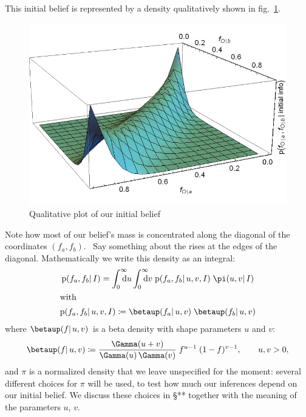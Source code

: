 \documentclass[\ifafour a4paper,12pt,\else a5paper,10pt,\fi%
onecolumn,oneside,article,%
british%
]{memoir}
\theoremstyle{remark}
\theoremstyle{innote}
\newcommand*{\di}{\mathrm{d}}%
\newcommand*{\defd}{\coloneqq}
\newcommand*{\pf}{\mathrm{p}}%
\renewcommand*{\|}{\mathpunct{|}}
\newcommand*{\sect}{\S}%
\newcommand*{\fig}{fig.}%
\newcommand*{\puzzle}{\maltese}
\newcommand{\mynote}[1]{ {\color{notecolour}\puzzle\ #1}}
\newcommand*{\yI}{I}
\newcommand*{\ya}{a}
\newcommand*{\yb}{b}
\newcommand*{\dbeta}{\betaup}
\newcommand*{\dA}{\pi}
\newcommand*{\yua}{u}
\newcommand*{\yub}{v}
\begin{document}
This initial belief is represented by a density qualitatively shown in
\fig~\ref{fig:initial_belief}.
\begin{figure}[b!]%
 \centering\includegraphics[width=0.95\linewidth]{prior3d.png}
\caption{Qualitative plot of our initial belief}\label{fig:initial_belief}
\end{figure}%
Note how most of our belief's mass is concentrated along the diagonal of
the coordinates $(f_{\ya}, f_{\yb})$. \mynote{Say something
  about the rises at the edges of the diagonal.} Mathematically we write
this density as an integral:
\begin{gather}
  \label{eq:beta_gamma_prior}
  \pf(f_{\ya}, f_{\yb} \| \yI)
  =
  \int_{\mathrlap{0}}^{\mathrlap{\infty}}\di\yua
  \int_{\mathrlap{0}}^{\mathrlap{\infty}}\di\yub\;
\pf(f_{\ya}, f_{\yb} \| \yua,\yub,\yI)\;
  \dA(\yua,\yub \| \yI)
  \\
\shortintertext{with}
  \label{eq:def_ff_given_Aq}
\pf(f_{\ya}, f_{\yb} \| \yua,\yub,\yI)\defd
  \dbeta(f_{\ya} \| \yua,\yub)\;
  \dbeta(f_{\yb} \| \yua,\yub)
\end{gather}
where $\dbeta(f \| \yua,\yub)$ is a beta density with shape
parameters $\yua$ and $\yub$:
\begin{equation}
  \label{eq:def_beta}
  \dbeta(f \| \yua,\yub) \defd
  \frac{\Gamma(\yua+\yub)}{\Gamma(\yua)\,\Gamma(\yub)}\;
  f^{\yua-1}\;(1-f)^{\yub-1},
  \qquad  \yua,\yub>0,
\end{equation}
and $\dA$ is a normalized density that we leave unspecified for the moment: several
different choices for $\dA$ will be used, to test how much our inferences
depend on our initial belief. We discuss these choices in \sect*** together
with the meaning of the parameters $\yua$, $\yub$.
\end{document}
